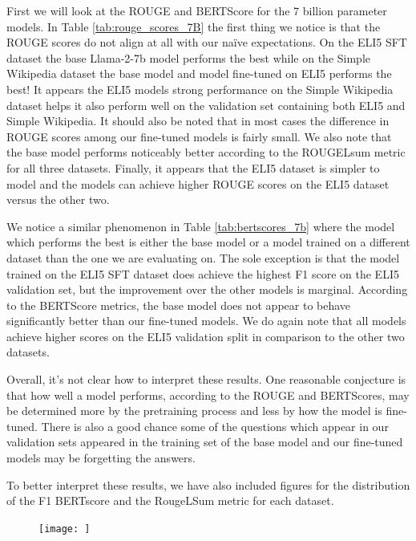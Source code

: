 \documentclass[11pt, oneside]{article}   	%
\begin{document}


First we will look at the ROUGE and BERTScore for the 7 billion parameter models.
In Table \ref{tab:rouge_scores_7B} the first thing we notice is that the ROUGE scores do not align at all with our na\"ive expectations.
On the ELI5 SFT dataset the base Llama-2-7b model performs the best while on the Simple Wikipedia dataset the base model and model fine-tuned on ELI5 performs the best!
It appears the ELI5 models strong performance on the Simple Wikipedia dataset helps it also perform well on the validation set containing both ELI5 and Simple Wikipedia.
It should also be noted that in most cases the difference in ROUGE scores among our fine-tuned models is fairly small.
We also note that the base model performs noticeably better according to the ROUGELsum metric for all three datasets.
Finally, it appears that the ELI5 dataset is simpler to model and the models can achieve higher ROUGE scores on the ELI5 dataset versus the other two.

We notice a similar phenomenon in Table \ref{tab:bertscores_7b} where the model which performs the best is either the base model or a model trained on a different dataset than the one we are evaluating on.
The sole exception is that the model trained on the ELI5 SFT dataset does achieve the highest F1 score on the ELI5 validation set, but the improvement over the other models is marginal.
According to the BERTScore metrics, the base model does not appear to behave significantly better than our fine-tuned models.
We do again note that all models achieve higher scores on the ELI5 validation split in comparison to the other two datasets. 

Overall, it's not clear how to interpret these results.
One reasonable conjecture is that how well a model performs, according to the ROUGE and BERTScores, may be determined more by the pretraining process and less by how the model is fine-tuned.
There is also a good chance some of the questions which appear in our validation sets appeared in the training set of the base model and our fine-tuned models may be forgetting the answers.

To better interpret these results, we have also included figures for the distribution of the F1 BERTscore and the RougeLSum metric for each dataset.
\begin{figure}
\texttt{[image: ]}
\end{figure}
\end{document}
